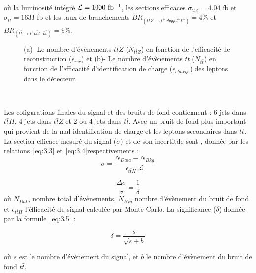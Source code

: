 ~\par o\`u la luminosit\'e int\'egr\'e $\mathcal{L}=1000\ \rm{fb^{-1}}$, les sections efficaces $\sigma_{t\bar{t}Z}=4.04$ fb et $\sigma_{t\bar{t}}=1633$ fb et les taux de branchements $BR_{(t\bar{t}Z{\rightarrow}l^+{\nu}\bar{b}q\bar{q}bl^+l^-)}=4\%$ et $BR_{(t\bar{t}{\rightarrow}l^+{\nu}\bar{b}l^-\bar{\nu}\bar{b})}=9\%$.

\begin{figure}[H]
  \centering
  \quad
  \caption{(a)- Le nombre d'\'ev\`enements $t\bar{t}Z$ ($N_{t\bar{t}Z}$) en fonction de l'efficacit\'e de reconstruction ($\epsilon_{rec}$) et (b)- Le nombre d'\'ev\`enements $t\bar{t}$ ($N_{t\bar{t}}$) en fonction de l'efficacit\'e d'identification de charge ($\epsilon_{charge}$) des leptons dans le d\'etecteur.}
  \label{figure:3.2}
\end{figure}

~\par Les cofigurations finales du signal et des bruits de fond contiennent : 6 jets dans $t\bar{t}H$, 4 jets dans $t\bar{t}Z$ et 2 ou 4 jets dans $t\bar{t}$. Avec un bruit de fond plus important qui provient de la mal identification de charge et les leptons secondaires dans $t\bar{t}$.\\
La section efficace mesuré du signal ($\sigma$) et de son incertitde sont , donn\'ee par les relations~\eqref{eq:3.3} et~\eqref{eq:3.4}respectivements : 
\begin{equation}
  \label{eq:3.3}
  \sigma=\frac{N_{Data}-N_{Bkg}}{\epsilon_{t\bar{t}H}.\mathcal{L}}
\end{equation}

\begin{equation}
  \label{eq:3.4}
 \frac{ \Delta \sigma}{\sigma}=\frac{1}{\delta}
\end{equation}
o\`u $N_{Data}$ nombre total d'\'ev\`enements,  $N_{Bkg}$ nombre d'\'ev\`enement du bruit de fond et $\epsilon_{t\bar{t}H}$ l'\'efficacit\'e du signal calcul\'ee par Monte Carlo. La significance ($\delta$) donn\'ee par la formule~\eqref{eq:3.5} : 

\begin{equation}
  \label{eq:3.5}
  \delta=\frac{s}{\sqrt{s+b}}
\end{equation}

o\`u $s$ est le nombre d'\'ev\`enement du signal, et $b$ le nombre d'\'ev\`enement du bruit de fond $t\bar{t}$.\\

